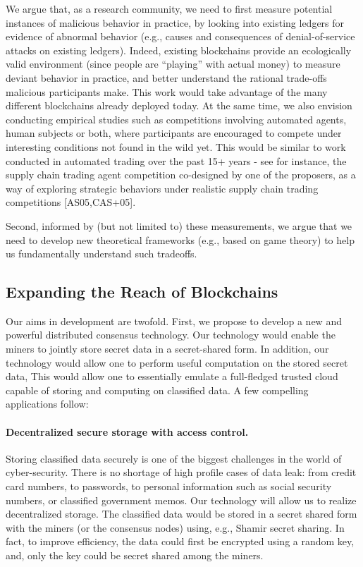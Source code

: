 \documentclass[runningheads, 12pt]{article}
\begin{document}
We argue that, as a research community, we need to first measure potential instances of malicious behavior in practice, by looking into existing ledgers for evidence of abnormal behavior (e.g., causes and consequences of denial-of-service attacks on existing ledgers). Indeed, existing blockchains provide an ecologically valid environment (since people are “playing” with actual money) to measure deviant behavior in practice, and better understand the rational trade-offs malicious participants make. This work would take advantage of the many different blockchains already deployed today. At the same time, we also envision conducting  empirical studies such as competitions involving  automated agents, human subjects or both, where participants are encouraged to compete under interesting conditions not found in the wild yet. This would be similar to work conducted in automated trading over the past 15+ years - see for instance, the supply chain trading agent competition co-designed by one of the proposers, as a way of exploring strategic behaviors under realistic supply chain trading competitions [AS05,CAS+05].

Second, informed by (but not limited to) these measurements, we argue that we need to develop new theoretical frameworks (e.g., based on game theory) to help us fundamentally understand such tradeoffs.

\vspace{-4pt}
\subsection{Expanding the Reach of Blockchains}
\vspace{-3pt}

Our aims in development are twofold. First, we propose to develop a new and powerful distributed consensus technology. Our technology would enable the miners to jointly store secret data in a secret-shared form.  In addition, our technology would allow one to perform useful computation on the stored secret data, This would allow one to essentially emulate a full-fledged trusted cloud capable of storing and computing on classified data. A few compelling applications follow:

\vspace{-5pt}
\paragraph{Decentralized secure storage with access control.} Storing classified data securely is one of the biggest challenges in the world of cyber-security. There is no shortage of high profile cases of data leak: from credit card numbers, to passwords, to personal information such as social security numbers, or classified government memos. Our technology will allow us to realize decentralized storage. The classified data would be stored in a secret shared form with the miners (or the consensus nodes) using, e.g., Shamir secret sharing. In fact, to improve efficiency, the data could first be encrypted using a random key, and, only the key could be secret shared among the miners.
\end{document}
